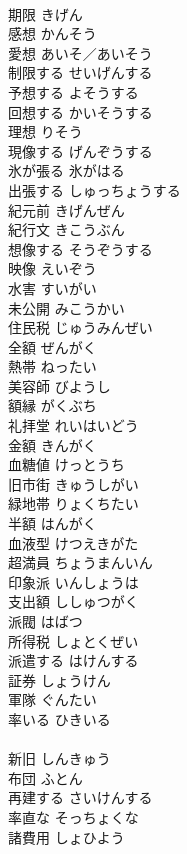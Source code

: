 \documentclass[8pt]{extreport}
\begin{document}
\begin{CJK}{UTF8}{min}
\\	期限	きげん	
\\	感想	かんそう	
\\	愛想	あいそ／あいそう	
\\	制限する	せいげんする	
\\	予想する	よそうする	
\\	回想する	かいそうする	
\\	理想	りそう	
\\	現像する	げんぞうする	
\\	氷が張る	氷がはる	
\\	出張する	しゅっちょうする	
\\	紀元前	きげんぜん	
\\	紀行文	きこうぶん	
\\	想像する	そうぞうする	
\\	映像	えいぞう	
\\	水害	すいがい	
\\	未公開	みこうかい	
\\	住民税	じゅうみんぜい	
\\	全額	ぜんがく	
\\	熱帯	ねったい	
\\	美容師	びようし	
\\	額縁	がくぶち	
\\	礼拝堂	れいはいどう	
\\	金額	きんがく	
\\	血糖値	けっとうち	
\\	旧市街	きゅうしがい	
\\	緑地帯	りょくちたい	
\\	半額	はんがく	
\\	血液型	けつえきがた	
\\	超満員	ちょうまんいん	
\\	印象派	いんしょうは	
\\	支出額	ししゅつがく	
\\	派閥	はばつ	
\\	所得税	しょとくぜい	
\\	派遣する	はけんする	
\\	証券	しょうけん	
\\	軍隊	ぐんたい	
\\	率いる	ひきいる	
\\	[和語]
\\	新旧	しんきゅう	
\\	布団	ふとん	
\\	再建する	さいけんする	
\\	率直な	そっちょくな	
\\	諸費用	しょひよう	

\end{CJK}
\end{document}

